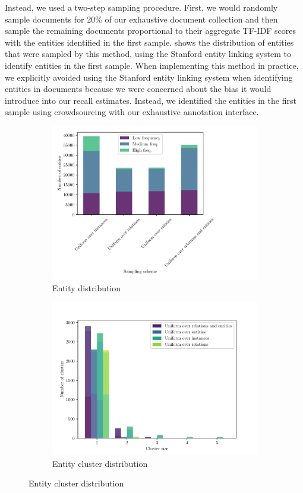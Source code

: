 Instead, we used a two-step sampling procedure.
First, we would randomly sample documents for 20\% of our exhaustive document collection and then sample the remaining documents proportional to their aggregate TF-IDF scores with the entities identified in the first sample.
 shows the distribution of entities that were sampled by this method, using the Stanford entity linking system to identify entities in the first sample.
When implementing this method in practice, we explicitly avoided using the Stanford entity linking system when identifying entities in documents because we were concerned about the bias it would introduce into our recall estimates.
Instead, we identified the entities in the first sample using crowdsourcing with our exhaustive annotation interface.

\begin{figure}
  \centering
  \begin{subfigure}{0.8\textwidth}
    \includegraphics[width=\textwidth]{figures/analysis/selective_supervised_entity}
    \caption{Entity distribution}
  \end{subfigure}

  \begin{subfigure}{0.8\textwidth}
    \includegraphics[width=\textwidth]{figures/analysis/selective_supervised_clusters}
    \caption{Entity cluster distribution}
  \end{subfigure}


\end{figure}

